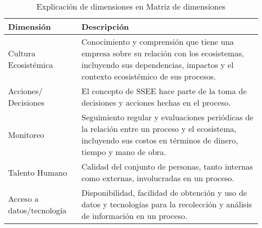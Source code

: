
\begin{table}[H]
    \centering
    \begin{tabular}{p{5cm} | p{10cm}}
        \textbf{Dimensión} & \textbf{Descripción} \\
        \hline\hline
        Cultura Ecosistémica & Conocimiento y comprensión que tiene una empresa sobre su relación con los ecosistemas, incluyendo sus dependencias, impactos y el contexto ecosistémico de sus procesos.\\
        \hline
        Acciones/ Decisiones & El concepto de SSEE hace parte de la toma de decisiones y acciones hechas en el proceso.\\
        \hline
        Monitoreo & Seguimiento regular y evaluaciones periódicas de la relación entre un proceso y el ecosistema, incluyendo sus costos en términos de dinero, tiempo y mano de obra.\\
        \hline
        Talento Humano & Calidad del conjunto de personas, tanto internas como externas, involucradas en un proceso. \\
        \hline
        Acceso a datos/tecnología & Disponibilidad, facilidad de obtención y uso de datos y tecnologías para la recolección y análisis de información en un proceso.\\
        \hline
    \end{tabular}
    \caption{Explicación de dimensiones en Matriz de dimensiones}
    \label{tab:matriz-dimensiones}
\end{table}